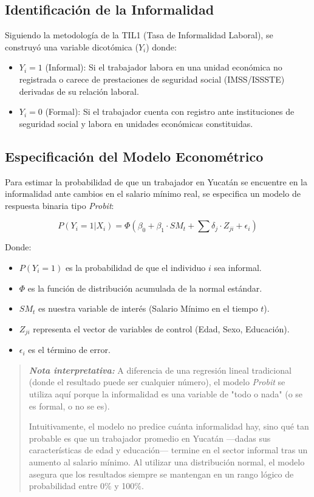 \subsection{Identificación de la Informalidad}
Siguiendo la metodología de la TIL1 (Tasa de Informalidad Laboral), se construyó una variable dicotómica ($Y_i$) donde:
\begin{itemize}
    \item $Y_i = 1$ (Informal): Si el trabajador labora en una unidad económica no registrada o carece de prestaciones de seguridad social (IMSS/ISSSTE) derivadas de su relación laboral.
    \item $Y_i = 0$ (Formal): Si el trabajador cuenta con registro ante instituciones de seguridad social y labora en unidades económicas constituidas.
\end{itemize}

\subsection{Especificación del Modelo Econométrico}
Para estimar la probabilidad de que un trabajador en Yucatán se encuentre en la informalidad ante cambios en el salario mínimo real, se especifica un modelo de respuesta binaria tipo \textit{Probit}:

\begin{equation}
    P(Y_i = 1 | X_i) = \Phi(\beta_0 + \beta_1 \cdot SM_t + \sum \delta_j \cdot Z_{ji} + \epsilon_i)
\end{equation}

Donde:
\begin{itemize}
    \item $P(Y_i = 1)$ es la probabilidad de que el individuo $i$ sea informal.
    \item $\Phi$ es la función de distribución acumulada de la normal estándar.
    \item $SM_t$ es nuestra variable de interés (Salario Mínimo en el tiempo $t$).
    \item $Z_{ji}$ representa el vector de variables de control (Edad, Sexo, Educación).
    \item $\epsilon_i$ es el término de error.
\end{itemize}

\begin{quote}
    \textit{\textbf{Nota interpretativa:}} A diferencia de una regresión lineal tradicional (donde el resultado puede ser cualquier número), el modelo \textit{Probit} se utiliza aquí porque la informalidad es una variable de "todo o nada" (o se es formal, o no se es). 

    Intuitivamente, el modelo no predice cuánta informalidad hay, sino qué tan probable es que un trabajador promedio en Yucatán —dadas sus características de edad y educación— termine en el sector informal tras un aumento al salario mínimo. Al utilizar una distribución normal, el modelo asegura que los resultados siempre se mantengan en un rango lógico de probabilidad entre 0\% y 100\%.
\end{quote}